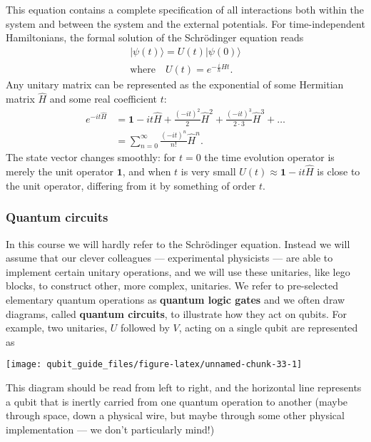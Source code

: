 \documentclass[fleqn]{article}
\begin{document}
This equation contains a complete specification of all interactions both within the system and between the system and the external potentials.
For time-independent Hamiltonians, the formal solution of the Schrödinger equation reads
\[
  \begin{gathered}
    |\psi(t)\rangle = U(t) |\psi(0)\rangle
  \\\text{where}\quad U(t) = e^{-\frac{i}{\hbar}\hat{H}t}.
  \end{gathered}
\]
Any unitary matrix can be represented as the exponential of some Hermitian matrix \(\hat{H}\) and some real coefficient \(t\):
\[
  \begin{aligned}
    e^{-it\hat{H}}
    &= \mathbf{1}- it\hat{H} + \frac{(-it)^2}{2}\hat{H}^2 + \frac{(-it)^3}{2\cdot3}\hat{H}^3 +\ldots
  \\&= \sum_{n=0}^\infty \frac{(-it)^n}{n!}\hat{H}^n.
  \end{aligned}
\]
The state vector changes smoothly: for \(t=0\) the time evolution operator is merely the unit operator \(\mathbf{1}\), and when \(t\) is very small \(U(t)\approx \mathbf{1}-it\hat{H}\) is close to the unit operator, differing from it by something of order \(t\).

\hypertarget{quantum-circuits}{%
\subsubsection{Quantum circuits}\label{quantum-circuits}}

In this course we will hardly refer to the Schrödinger equation.
Instead we will assume that our clever colleagues --- experimental physicists --- are able to implement certain unitary operations, and we will use these unitaries, like lego blocks, to construct other, more complex, unitaries.
We refer to pre-selected elementary quantum operations as \textbf{quantum logic gates} and we often draw diagrams, called \textbf{quantum circuits}, to illustrate how they act on qubits.
For example, two unitaries, \(U\) followed by \(V\), acting on a single qubit are represented as

\begin{center}\texttt{[image: qubit\_guide\_files/figure-latex/unnamed-chunk-33-1]} \end{center}

This diagram should be read from left to right, and the horizontal line represents a qubit that is inertly carried from one quantum operation to another (maybe through space, down a physical wire, but maybe through some other physical implementation --- we don't particularly mind!)
\end{document}
